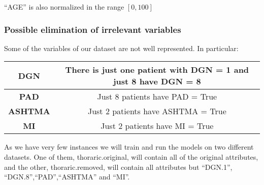 ``AGE'' is also normalized in the range \([0, 100]\)

\subsubsection{Possible elimination of irrelevant variables}

Some of the variables of our dataset are not well represented. In particular:

\begin{center}
\begin{tabular}{|c|c|}
  \hline
  \textbf{DGN} & There is just one patient with DGN = 1 and just 8 have DGN = 8 \\
  \hline
  \textbf{PAD} & Just 8 patients have PAD = True \\
  \hline
  \textbf{ASHTMA} & Just 2 patients have ASHTMA = True \\
  \hline
  \textbf{MI} & Just 2 patients have MI = True \\
  \hline
\end{tabular}
\end{center}

As we have very few instances we will train and run the models on two different datasets. One of them, thoraric.original, will contain all of the original attributes, and the other, thoraric.removed, will contain all attributes but  ``DGN.1'', ``DGN.8'',``PAD'',``ASHTMA'' and ``MI''.



%

